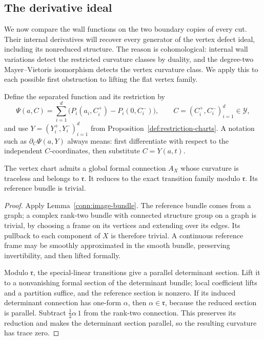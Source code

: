 \subsection{The derivative ideal}

We now compare the wall functions on the two boundary copies of every
cut. Their internal derivatives will recover every generator of the
vertex defect ideal, including its nonreduced structure.  The reason is
cohomological: internal wall variations detect the restricted curvature
classes by duality, and the degree-two Mayer--Vietoris isomorphism
detects the vertex curvature class.  We apply this to each possible
first obstruction to lifting the flat vertex family.

Define the separated function and its restriction by
\begin{equation}
 \Psi(a,C)=\sum_{i=1}^d
       \bigl(P_i(a_i,C_i^+)-P_i(0,C_i^-)\bigr),
 \qquad C=(C_i^+,C_i^-)_{i=1}^d\in\mathcal Y ,
 \label{conn:psi}
\end{equation}
and use \(Y=(Y_i^+,Y_i^-)_{i=1}^d\) from
Proposition~\ref{def:restriction-charts}.  A notation such as
\(\partial_C\Psi(a,Y)\) always means: first differentiate with
respect to the independent \(C\)-coordinates, then substitute
\(C=Y(a,t)\).

\begin{lemma}
\label{conn:vertex-connection}
The vertex chart admits a global formal connection \(A_X\)
whose curvature is traceless and belongs to \(\mathfrak r\).
It reduces to the exact transition family modulo
\(\mathfrak r\).  Its reference bundle is trivial.
\end{lemma}

\begin{proof}
Apply Lemma~\ref{conn:image-bundle}.  The reference bundle
comes from a graph; a complex rank-two bundle with connected
structure group on a graph is trivial, by choosing a frame
on its vertices and extending over its edges.  Its pullback
to each component of \(X\) is therefore trivial.  A continuous
reference frame may be smoothly approximated in the smooth
bundle, preserving invertibility, and then lifted formally.

Modulo \(\mathfrak r\), the special-linear transitions give
a parallel determinant section.  Lift it to a nonvanishing
formal section of the determinant bundle; local coefficient
lifts and a partition suffice, and the reference section
is nonzero.  If its induced determinant connection has
one-form \(\alpha\), then \(\alpha\in\mathfrak r\), because
the reduced section is parallel.  Subtract
\(\frac12\alpha\,1\) from the rank-two connection.
This preserves its reduction and makes the determinant
section parallel, so the resulting curvature has trace zero.
\end{proof}

